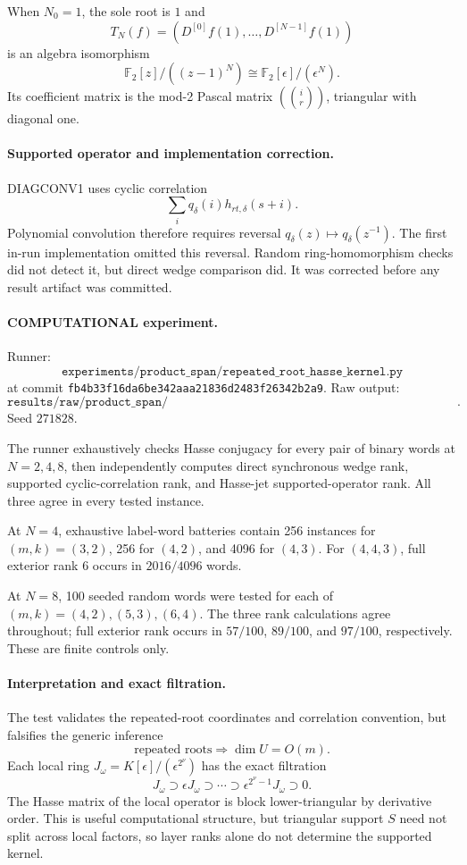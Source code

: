\documentclass[11pt]{article}
\begin{document}
When \(N_0=1\), the sole root is \(1\) and
\[
T_N(f)=(D^{[0]}f(1),\ldots,D^{[N-1]}f(1))
\]
is an algebra isomorphism
\[
\boxed{\mathbb F_2[z]/((z-1)^N)\cong\mathbb F_2[\epsilon]/(\epsilon^N).}
\]
Its coefficient matrix is the mod-2 Pascal matrix \((\binom{i}{r})\), triangular with diagonal one.

\paragraph{Supported operator and implementation correction.}
DIAGCONV1 uses cyclic correlation
\[
\sum_i q_\delta(i)h_{rt,\delta}(s+i).
\]
Polynomial convolution therefore requires reversal \(q_\delta(z)\mapsto q_\delta(z^{-1})\). The first in-run implementation omitted this reversal. Random ring-homomorphism checks did not detect it, but direct wedge comparison did. It was corrected before any result artifact was committed.

\paragraph{COMPUTATIONAL experiment.}
Runner:
\[
\texttt{experiments/product\_span/repeated\_root\_hasse\_kernel.py}
\]
at commit \texttt{fb4b33f16da6be342aaa21836d2483f26342b2a9}. Raw output:
\[
\texttt{results/raw/product\_span/2026-10-01\_LSPV1\_repeated\_root\_hasse\_kernel.json}.
\]
Seed \(271828\).

The runner exhaustively checks Hasse conjugacy for every pair of binary words at \(N=2,4,8\), then independently computes direct synchronous wedge rank, supported cyclic-correlation rank, and Hasse-jet supported-operator rank. All three agree in every tested instance.

At \(N=4\), exhaustive label-word batteries contain 256 instances for \((m,k)=(3,2)\), 256 for \((4,2)\), and 4096 for \((4,3)\). For \((4,4,3)\), full exterior rank \(6\) occurs in \(2016/4096\) words.

At \(N=8\), 100 seeded random words were tested for each of \((m,k)=(4,2),(5,3),(6,4)\). The three rank calculations agree throughout; full exterior rank occurs in \(57/100\), \(89/100\), and \(97/100\), respectively. These are finite controls only.

\paragraph{Interpretation and exact filtration.}
The test validates the repeated-root coordinates and correlation convention, but falsifies the generic inference
\[
\text{repeated roots}\Longrightarrow \dim U=O(m).
\]
Each local ring \(J_\omega=K[\epsilon]/(\epsilon^{2^\nu})\) has the exact filtration
\[
J_\omega\supset\epsilon J_\omega\supset\cdots\supset\epsilon^{2^\nu-1}J_\omega\supset0.
\]
The Hasse matrix of the local operator is block lower-triangular by derivative order. This is useful computational structure, but triangular support \(S\) need not split across local factors, so layer ranks alone do not determine the supported kernel.
\end{document}
